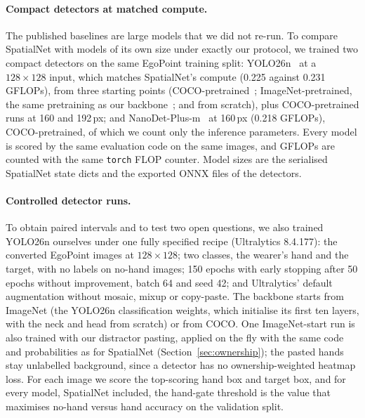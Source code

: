 \paragraph{Compact detectors at matched compute.} The published baselines are large models that we did not re-run. To compare SpatialNet with models of its own size under exactly our protocol, we trained two compact detectors on the same EgoPoint training split: YOLO26n~\cite{ultralytics2026yolo26} at a $128\times128$ input, which matches SpatialNet's compute (0.225 against 0.231 GFLOPs), from three starting points (COCO-pretrained~\cite{lin2014coco}; ImageNet-pretrained, the same pretraining as our backbone~\cite{deng2009imagenet}; and from scratch), plus COCO-pretrained runs at 160 and 192\,px; and NanoDet-Plus-m~\cite{rangilyu2021nanodet} at 160\,px (0.218 GFLOPs), COCO-pretrained, of which we count only the inference parameters.  Every model is scored by the same evaluation code on the same images, and GFLOPs are counted with the same \texttt{torch} FLOP counter. Model sizes are the serialised SpatialNet state dicts and the exported ONNX files of the detectors.

\paragraph{Controlled detector runs.} To obtain paired intervals and to test two open questions, we also trained YOLO26n ourselves under one fully specified recipe (Ultralytics 8.4.177): the converted EgoPoint images at $128\times128$; two classes, the wearer's hand and the target, with no labels on no-hand images; 150 epochs with early stopping after 50 epochs without improvement, batch 64 and seed 42; and Ultralytics' default augmentation without mosaic, mixup or copy-paste. The backbone starts from ImageNet (the YOLO26n classification weights, which initialise its first ten layers, with the neck and head from scratch) or from COCO. One ImageNet-start run is also trained with our distractor pasting, applied on the fly with the same code and probabilities as for SpatialNet (Section~\ref{sec:ownership}); the pasted hands stay unlabelled background, since a detector has no ownership-weighted heatmap loss. For each image we score the top-scoring hand box and target box, and for every model, SpatialNet included, the hand-gate threshold is the value that maximises no-hand versus hand accuracy on the validation split.

